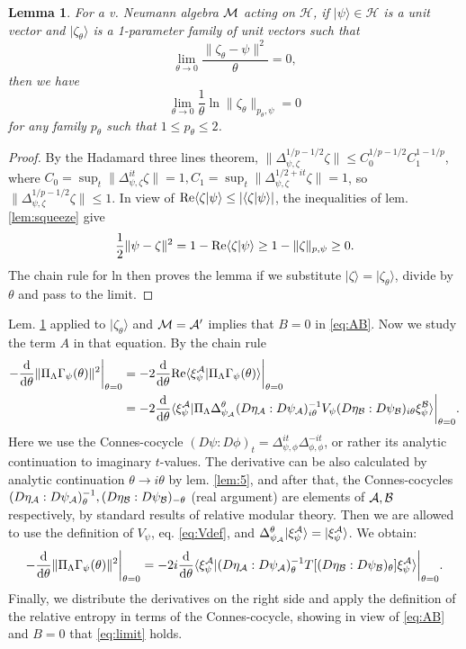 \documentclass[english,a4paper,12pt]{article}
\newtheorem{lemma}{Lemma}
\def\sH{\mathscr{H}}
\def\cA{{\mathfrak A}}
\def\cB{{\mathfrak B}}
\def\cM{{\mathfrak M}}
\newcommand{\ca}[1]{{\cal #1}}
\newcommand{\ben}{\begin{equation}}
\newcommand{\een}{\end{equation}}
\def\cA{{\ca A}}
\def\cB{{\ca B}}
\def\cM{{\ca M}}
\newcommand{\dd}{{\rm d}}
\renewcommand{\log}{\operatorname{ln}}
\renewcommand{\Re}{{\rm Re}}
\begin{document}
\begin{lemma}
\label{lem:firstlaw}
For a v. Neumann algebra $\cM$ acting on $\sH$, if $|\psi\rangle \in \sH$ is a unit vector 
and $|\zeta_\theta \rangle$ is a 1-parameter family of unit vectors such that 
\ben
\lim_{\theta \to 0} \frac{\| \zeta_\theta - \psi\|^2}{\theta} = 0,
\een 
then we have 
\ben
\lim_{\theta \to 0} \frac{1}{\theta} \log \|\zeta_\theta \|_{p_\theta,\psi} = 0
\een
for any family $p_\theta$ such that $1 \le p_\theta \le 2$.
\end{lemma}
\begin{proof}
By the Hadamard three lines theorem, $\| \Delta_{\psi,\zeta}^{1/p-1/2} \zeta \| \le C_0^{1/p-1/2} C_1^{1-1/p}$, where 
$C_0 = \sup_t \| \Delta^{it}_{\psi,\zeta} \zeta \| = 1, C_1 = \sup_t \| \Delta^{1/2 + it}_{\psi,\zeta} \zeta \| = 1$, so 
$\| \Delta_{\psi,\zeta}^{1/p-1/2} \zeta \| \le 1$. In view of 
${\rm Re} \langle \zeta | \psi \rangle \le | \langle \zeta | \psi \rangle |$, the inequalities of lem. \ref{lem:squeeze} give
\ben
\frac{1}{2} \| \psi-\zeta\|^2 = 1- {\rm Re} \langle \zeta | \psi \rangle  \ge 1- \| \zeta \|_{p,\psi} \ge 0.
\een
The chain rule for ln then proves the lemma if we substitute $|\zeta\rangle=|\zeta_\theta\rangle$, divide by $\theta$
and pass to the limit. 
\end{proof}

Lem. \ref{lem:firstlaw} applied to $|\zeta_\theta\rangle$ and $\cM=\cA'$ implies that $B=0$ in \eqref{eq:AB}. Now we study the term $A$ in that equation. By the chain rule
\ben\label{eq:calc1}
\begin{split}
 -\frac{\dd}{\dd \theta} \| \Pi_\Lambda \Gamma_\psi (\theta) \|^2 \bigg|_{\theta=0} &=  -2\frac{\dd}{\dd \theta} \Re \langle \xi_{\psi}^{\cA} |\Pi_\Lambda \Gamma_\psi(\theta) \rangle \bigg|_{\theta=0} \\
 &=  -2\frac{\dd}{\dd \theta} \langle \xi_{\psi}^{\cA} |  \Pi_\Lambda \Delta_{\psi_\cA}^{\theta} (D\eta_\cA:D\psi_\cA)_{i\theta}^{-1} V_\psi (D\eta_\cB:D\psi_\cB)_{i\theta} \xi_{\psi}^{\cB} \rangle \bigg|_{\theta=0}. 
\end{split} 
\een
Here we use the Connes-cocycle $(D\psi:D\phi)_t = \Delta_{\psi,\phi}^{it} \Delta_{\phi,\phi}^{-it}$, or rather its analytic continuation to imaginary $t$-values. The derivative can be also calculated by analytic continuation $\theta \to i\theta$ by lem. \ref{lem:5}, and after that, the Connes-cocycles 
$(D\eta_\cA:D\psi_\cA)_{\theta}^{-1}, (D\eta_\cB:D\psi_\cB)_{-\theta}$ (real argument) are elements of $\cA, \cB$ respectively, by standard results of relative modular theory. 
Then we are allowed to use 
the definition of $V_\psi$, eq. \eqref{eq:Vdef}, and $ \Delta_{\psi_\cA}^{\theta}|\xi_{\psi}^{\cA} \rangle = |\xi_{\psi}^{\cA} \rangle$. We obtain:
\ben\label{eq:calc2}
 -\frac{\dd}{\dd \theta} \| \Pi_\Lambda \Gamma_\psi(\theta) \|^2 \bigg|_{\theta=0}
 = -2i\frac{\dd}{\dd \theta} \langle \xi_{\psi}^{\cA} | (D\eta_\cA:D\psi_\cA)_{\theta}^{-1} T[(D\eta_\cB:D\psi_\cB)_{\theta}] \xi_{\psi}^{\cA} \rangle \bigg|_{\theta=0}.
\een
Finally, we distribute the derivatives on the right side and apply the definition of the relative entropy in terms of the Connes-cocycle, showing in view of 
\eqref{eq:AB} and $B=0$ that \eqref{eq:limit} holds. 
\end{document}
